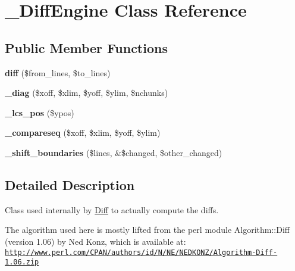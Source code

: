 \hypertarget{class__DiffEngine}{
\section{\_\-DiffEngine Class Reference}
\label{class__DiffEngine}
}
\subsection*{Public Member Functions}
\begin{CompactItemize}
\item 
\hypertarget{class__DiffEngine_296ddc238847dc847bc0ba03caa68f1f}{
\textbf{diff} (\$from\_\-lines, \$to\_\-lines)}
\label{class__DiffEngine_296ddc238847dc847bc0ba03caa68f1f}

\item 
\hypertarget{class__DiffEngine_0618824b8c3055fdfa150f4d08f8413a}{
\textbf{\_\-diag} (\$xoff, \$xlim, \$yoff, \$ylim, \$nchunks)}
\label{class__DiffEngine_0618824b8c3055fdfa150f4d08f8413a}

\item 
\hypertarget{class__DiffEngine_c5646563b449f31a61d1524b8ef2e6c6}{
\textbf{\_\-lcs\_\-pos} (\$ypos)}
\label{class__DiffEngine_c5646563b449f31a61d1524b8ef2e6c6}

\item 
\hypertarget{class__DiffEngine_f55fa4747075f309740db6aac6e5b909}{
\textbf{\_\-compareseq} (\$xoff, \$xlim, \$yoff, \$ylim)}
\label{class__DiffEngine_f55fa4747075f309740db6aac6e5b909}

\item 
\hypertarget{class__DiffEngine_30fe765bccbe006e66f7ba5342bbe2d7}{
\textbf{\_\-shift\_\-boundaries} (\$lines, \&\$changed, \$other\_\-changed)}
\label{class__DiffEngine_30fe765bccbe006e66f7ba5342bbe2d7}

\end{CompactItemize}


\subsection{Detailed Description}
Class used internally by \hyperlink{classDiff}{Diff} to actually compute the diffs.

The algorithm used here is mostly lifted from the perl module Algorithm::Diff (version 1.06) by Ned Konz, which is available at: \href{http://www.perl.com/CPAN/authors/id/N/NE/NEDKONZ/Algorithm-Diff-1.06.zip}{\tt http://www.perl.com/CPAN/authors/id/N/NE/NEDKONZ/Algorithm-Diff-1.06.zip}

